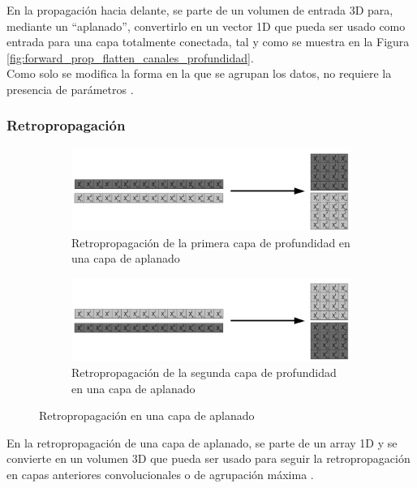 En la propagación hacia delante, se parte de un volumen de entrada 3D para, mediante un ``aplanado'', convertirlo en un vector 1D que pueda ser usado como entrada para una capa totalmente conectada, tal y como se muestra en la Figura \ref{fig:forward_prop_flatten_canales_profundidad}. \\
Como solo se modifica la forma en la que se agrupan los datos, no requiere la presencia de parámetros \cite{flatten_forward}.

\subsubsection{Retropropagación}

\begin{figure}[H]
	\centering
	\begin{subfigure}{.5\textwidth}
		\hspace{-30mm}
		\includegraphics[width=2\linewidth]{imagenes/back_flatten_1.jpg}  
		\caption{Retropropagación de la primera capa de profundidad en una capa de aplanado}
	\end{subfigure}
	\begin{subfigure}{.5\textwidth}
		\hspace{-30mm}
		\includegraphics[width=2\linewidth]{imagenes/back_flatten_2.jpg}  
		\caption{Retropropagación de la segunda capa de profundidad en una capa de aplanado}
	\end{subfigure}
	
	\caption{Retropropagación en una capa de aplanado}
	\label{fig:back_prop_flatten_canales_profundidad}
\end{figure}

En la retropropagación de una capa de aplanado, se parte de un array 1D y se convierte en un volumen 3D que pueda ser usado para seguir la retropropagación en capas anteriores convolucionales o de agrupación máxima
\cite{flatten_forward}.

